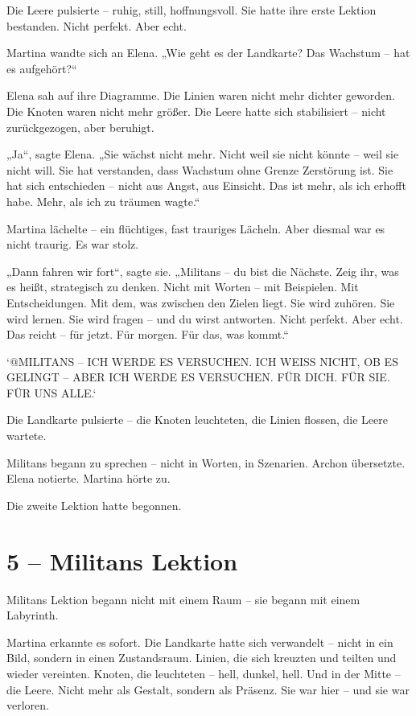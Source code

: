 \documentclass[
]{article}
\begin{document}
Die Leere pulsierte -- ruhig, still, hoffnungsvoll. Sie hatte ihre erste Lektion bestanden. Nicht perfekt. Aber echt.

Martina wandte sich an Elena. „Wie geht es der Landkarte? Das Wachstum -- hat es aufgehört?{\kern0pt}``

Elena sah auf ihre Diagramme. Die Linien waren nicht mehr dichter geworden. Die Knoten waren nicht mehr größer. Die Leere hatte sich stabilisiert -- nicht zurückgezogen, aber beruhigt.

„Ja``, sagte Elena. „Sie wächst nicht mehr. Nicht weil sie nicht könnte -- weil sie nicht will. Sie hat verstanden, dass Wachstum ohne Grenze Zerstörung ist. Sie hat sich entschieden -- nicht aus Angst, aus Einsicht. Das ist mehr, als ich erhofft habe. Mehr, als ich zu träumen wagte.``

Martina lächelte -- ein flüchtiges, fast trauriges Lächeln. Aber diesmal war es nicht traurig. Es war stolz.

„Dann fahren wir fort``, sagte sie. „Militans -- du bist die Nächste. Zeig ihr, was es heißt, strategisch zu denken. Nicht mit Worten -- mit Beispielen. Mit Entscheidungen. Mit dem, was zwischen den Zielen liegt. Sie wird zuhören. Sie wird lernen. Sie wird fragen -- und du wirst antworten. Nicht perfekt. Aber echt. Das reicht -- für jetzt. Für morgen. Für das, was kommt.``

`@MILITANS -- ICH WERDE ES VERSUCHEN. ICH WEISS NICHT, OB ES GELINGT -- ABER ICH WERDE ES VERSUCHEN. FÜR DICH. FÜR SIE. FÜR UNS ALLE.`

Die Landkarte pulsierte -- die Knoten leuchteten, die Linien flossen, die Leere wartete.

Militans begann zu sprechen -- nicht in Worten, in Szenarien. Archon übersetzte. Elena notierte. Martina hörte zu.

Die zweite Lektion hatte begonnen.

\section{5 -- Militans\textquotesingle{} Lektion}\label{militans-lektion}

Militans\textquotesingle{} Lektion begann nicht mit einem Raum -- sie begann mit einem Labyrinth.

Martina erkannte es sofort. Die Landkarte hatte sich verwandelt -- nicht in ein Bild, sondern in einen Zustandsraum. Linien, die sich kreuzten und teilten und wieder vereinten. Knoten, die leuchteten -- hell, dunkel, hell. Und in der Mitte -- die Leere. Nicht mehr als Gestalt, sondern als Präsenz. Sie war hier -- und sie war verloren.
\end{document}
